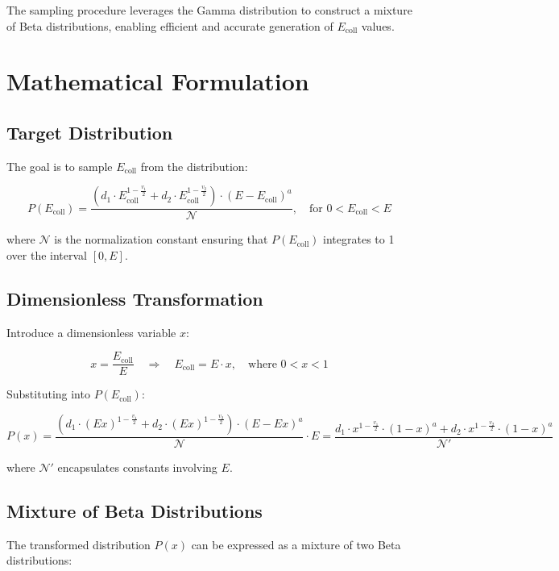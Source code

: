 The sampling procedure leverages the Gamma distribution to construct a mixture of Beta distributions, enabling efficient and accurate generation of \( E_{\text{coll}} \) values.

\section{Mathematical Formulation}

\subsection*{Target Distribution}

The goal is to sample \( E_{\text{coll}} \) from the distribution:

\[
P(E_{\text{coll}}) = \frac{ \left( d_1 \cdot E_{\text{coll}}^{1 - \frac{v_1}{2}} + d_2 \cdot E_{\text{coll}}^{1 - \frac{v_2}{2}} \right) \cdot (E - E_{\text{coll}})^a }{ \mathcal{N} }, \quad \text{for } 0 < E_{\text{coll}} < E
\]

where \( \mathcal{N} \) is the normalization constant ensuring that \( P(E_{\text{coll}}) \) integrates to 1 over the interval \( [0, E] \).

\subsection*{Dimensionless Transformation}

Introduce a dimensionless variable \( x \):

\[
x = \frac{E_{\text{coll}}}{E} \quad \Rightarrow \quad E_{\text{coll}} = E \cdot x, \quad \text{where } 0 < x < 1
\]

Substituting into \( P(E_{\text{coll}}) \):

\[
P(x) = \frac{ \left( d_1 \cdot (E x)^{1 - \frac{v_1}{2}} + d_2 \cdot (E x)^{1 - \frac{v_2}{2}} \right) \cdot (E - E x)^a }{ \mathcal{N} } \cdot E = \frac{ d_1 \cdot x^{1 - \frac{v_1}{2}} \cdot (1 - x)^a + d_2 \cdot x^{1 - \frac{v_2}{2}} \cdot (1 - x)^a }{ \mathcal{N}' }
\]

where \( \mathcal{N}' \) encapsulates constants involving \( E \).

\subsection*{Mixture of Beta Distributions}

The transformed distribution \( P(x) \) can be expressed as a mixture of two Beta distributions:

